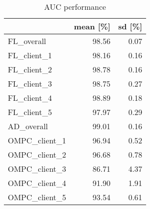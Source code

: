 \begin{table}[h]
\centering
\caption{AUC performance}
\label{tab:auc_performance}
\begin{tabular}{lrr}
\toprule
{} &  mean [\%] &  sd [\%] \\
\midrule
FL\_overall    &     98.56 &    0.07 \\
FL\_client\_1   &     98.16 &    0.16 \\
FL\_client\_2   &     98.78 &    0.16 \\
FL\_client\_3   &     98.75 &    0.27 \\
FL\_client\_4   &     98.89 &    0.18 \\
FL\_client\_5   &     97.97 &    0.29 \\
AD\_overall    &     99.01 &    0.16 \\
OMPC\_client\_1 &     96.94 &    0.52 \\
OMPC\_client\_2 &     96.68 &    0.78 \\
OMPC\_client\_3 &     86.71 &    4.37 \\
OMPC\_client\_4 &     91.90 &    1.91 \\
OMPC\_client\_5 &     93.54 &    0.61 \\
\bottomrule
\end{tabular}
\end{table}
